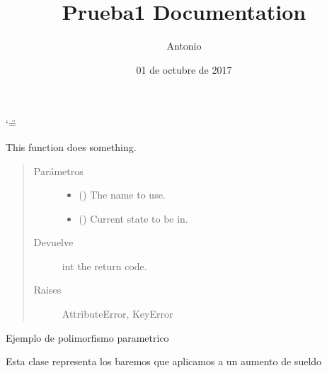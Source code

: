 \documentclass[letterpaper,10pt,spanish]{sphinxmanual}
\title{Prueba1 Documentation}
\date{01 de octubre de 2017}
\author{Antonio}
\begin{document}
\ifnum\catcode`\"=\active{}\fi
\maketitle
\sphinxtableofcontents
{}\label{\detokenize{index::doc}}

\label{\detokenize{index:module-test}}

\begin{fulllineitems}
\label{\detokenize{index:test.public_fn_with_sphinxy_docstring}}
This function does something.
\begin{quote}\begin{description}
\item[{Parámetros}] \leavevmode\begin{itemize}
\item {} 
 () \textendash{} The name to use.

\item {} 
 () \textendash{} Current state to be in.

\end{itemize}

\item[{Devuelve}] \leavevmode
int \textendash{} the return code.

\item[{Raises}] \leavevmode
AttributeError, KeyError

\end{description}\end{quote}

\end{fulllineitems}

\label{\detokenize{index:module-polimorfismo_doc}}
Ejemplo de polimorfismo parametrico

\begin{fulllineitems}
\label{\detokenize{index:polimorfismo_doc.tablaBaremos}}
Esta clase representa los baremos que aplicamos a un aumento de sueldo

\end{fulllineitems}
\end{document}
